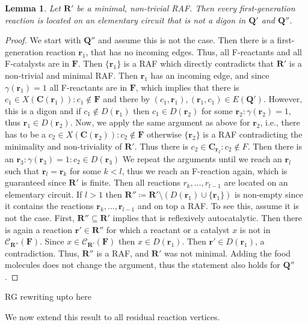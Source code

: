 \documentclass[pdflatex]{sn-jnl}
\theoremstyle{thmstyleone}%
\newtheorem{lemma}[theorem]{Lemma}%
\theoremstyle{examplesty}%
\theoremstyle{thmstylethree}%
\newcommand{\queen}{\mathbf{Q}}
\newcommand{\food}{\ensuremath{\mathbf{F}}}
\newcommand{\closure}[2]{\mathscr{C}_{#1}(#2)}
\newcommand{\fr}[0]{\mathbf{r}}
\newcommand{\RAF}[0]{\mathbf{R}'}
\newcommand{\cat}{\mathbf{C}}
\newcommand{\rgen}{\gamma}
\newcommand{\holy}[1]{\begingroup\color{royalpurple}#1\endgroup}
\begin{document}
\begin{lemma}
	Let $\RAF$ be a minimal, non-trivial RAF. Then every first-generation reaction 
	is located on an elementary circuit that is not a digon in $\queen'$ and $\queen''$.
\end{lemma}
\begin{proof}
	We start with $\queen''$ and assume this is not the case. Then there is a first-generation 
	reaction $\fr_1$, that has no incoming edges. Thus, all F-reactants and all F-catalysts are 
	in $\food$. Then $\{\fr_1\}$ is a RAF which directly contradicts that $\RAF$ is a non-trivial 
	and minimal RAF. Then $\fr_1$ has an incoming edge, and since $\rgen(\fr_1)=1$ all 
	F-reactants are in $\food$, which implies that there is $c_1\in X(\cat(\fr_1)): c_1\notin \food$
	and there by $(c_1,\fr_1),(\fr_1,c_1) \in E(\queen')$. However, this is a digon and if $c_1\notin 
	D(\fr_1)$ then $c_1\in D(\fr_2)$ for some $\fr_2: \rgen(\fr_2)=1$, thus $\fr_1\in D(\fr_2)$. Now, we apply 
	the same argument as above for $\fr_2$, i.e., there has to be a $c_2 \in X(\cat(\fr_2)): c_2\notin \food$
	otherwise $\{\fr_2\}$ is a RAF contradicting the minimality and non-triviality of $\RAF$. 
	Thus there is $c_2\in \cat_{\fr_2}: c_2\notin F$. Then there is an $\fr_3: \rgen(\fr_3)=1: c_2\in D(\fr_3)$ 
	We repeat the arguments until we reach an $\fr_l$ such that $\fr_l=\fr_k$ for some $k<l$, thus we reach 
	an F-reaction again, which is guaranteed since $\RAF$ is finite. Then all reactions $r_k, \ldots, r_{l-1}$ 
	are located on an elementary circuit. If $l>1$ then $\RAF'\coloneqq \RAF\setminus (D(\fr_1)\cup\{\fr_1\})$ 
	is non-empty since it contains the reactions $\fr_k,\ldots, \fr_{l-1}$ and on top a RAF.
	To see this, assume it is not the case. First, $\RAF'\subseteq \RAF$ implies that is reflexively autocatalytic. Then 
	there is again a reaction $\fr'\in \RAF'$ for which a reactant or a catalyst $x$ is not in $\closure{\RAF'}{\food}$. 
	Since $x\in \closure{\RAF}{\food}$ then $x\in D(\fr_1)$. Then $\fr'\in D(\fr_1)$, a contradiction. Thus, $\RAF'$ is
	a RAF, and $\RAF$ was not minimal. Adding the food molecules does not change the argument, thus the 
	statement also holds for $\queen''$.
\end{proof}
\vspace{6pt}

\holy{RG rewriting upto here}

We now extend this result to all residual reaction vertices.
\end{document}

